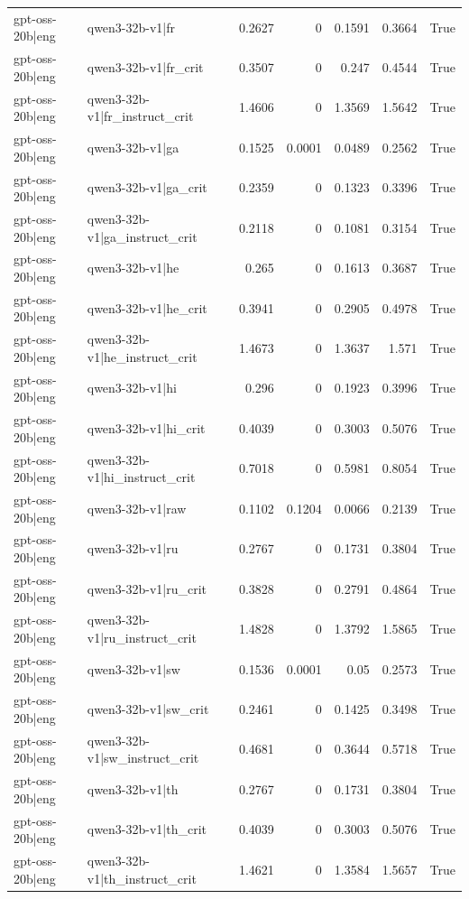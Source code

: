 \begin{table}
\begin{tabular}{l l r r r r l}
gpt-oss-20b|eng & qwen3-32b-v1|fr & 0.2627 & 0 & 0.1591 & 0.3664 & True \\
gpt-oss-20b|eng & qwen3-32b-v1|fr_crit & 0.3507 & 0 & 0.247 & 0.4544 & True \\
gpt-oss-20b|eng & qwen3-32b-v1|fr_instruct_crit & 1.4606 & 0 & 1.3569 & 1.5642 & True \\
gpt-oss-20b|eng & qwen3-32b-v1|ga & 0.1525 & 0.0001 & 0.0489 & 0.2562 & True \\
gpt-oss-20b|eng & qwen3-32b-v1|ga_crit & 0.2359 & 0 & 0.1323 & 0.3396 & True \\
gpt-oss-20b|eng & qwen3-32b-v1|ga_instruct_crit & 0.2118 & 0 & 0.1081 & 0.3154 & True \\
gpt-oss-20b|eng & qwen3-32b-v1|he & 0.265 & 0 & 0.1613 & 0.3687 & True \\
gpt-oss-20b|eng & qwen3-32b-v1|he_crit & 0.3941 & 0 & 0.2905 & 0.4978 & True \\
gpt-oss-20b|eng & qwen3-32b-v1|he_instruct_crit & 1.4673 & 0 & 1.3637 & 1.571 & True \\
gpt-oss-20b|eng & qwen3-32b-v1|hi & 0.296 & 0 & 0.1923 & 0.3996 & True \\
gpt-oss-20b|eng & qwen3-32b-v1|hi_crit & 0.4039 & 0 & 0.3003 & 0.5076 & True \\
gpt-oss-20b|eng & qwen3-32b-v1|hi_instruct_crit & 0.7018 & 0 & 0.5981 & 0.8054 & True \\
gpt-oss-20b|eng & qwen3-32b-v1|raw & 0.1102 & 0.1204 & 0.0066 & 0.2139 & True \\
gpt-oss-20b|eng & qwen3-32b-v1|ru & 0.2767 & 0 & 0.1731 & 0.3804 & True \\
gpt-oss-20b|eng & qwen3-32b-v1|ru_crit & 0.3828 & 0 & 0.2791 & 0.4864 & True \\
gpt-oss-20b|eng & qwen3-32b-v1|ru_instruct_crit & 1.4828 & 0 & 1.3792 & 1.5865 & True \\
gpt-oss-20b|eng & qwen3-32b-v1|sw & 0.1536 & 0.0001 & 0.05 & 0.2573 & True \\
gpt-oss-20b|eng & qwen3-32b-v1|sw_crit & 0.2461 & 0 & 0.1425 & 0.3498 & True \\
gpt-oss-20b|eng & qwen3-32b-v1|sw_instruct_crit & 0.4681 & 0 & 0.3644 & 0.5718 & True \\
gpt-oss-20b|eng & qwen3-32b-v1|th & 0.2767 & 0 & 0.1731 & 0.3804 & True \\
gpt-oss-20b|eng & qwen3-32b-v1|th_crit & 0.4039 & 0 & 0.3003 & 0.5076 & True \\
gpt-oss-20b|eng & qwen3-32b-v1|th_instruct_crit & 1.4621 & 0 & 1.3584 & 1.5657 & True \\

\end{tabular}
\end{table}
